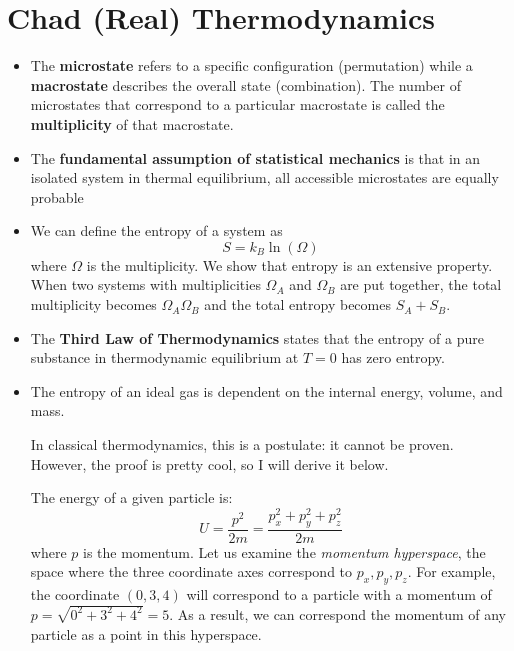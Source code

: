\section{Chad (Real) Thermodynamics}
\begin{itemize}
    \item The \textbf{microstate} refers to a specific configuration (permutation) while a \textbf{macrostate} describes the overall state (combination). The number of microstates that correspond to a particular macrostate is called the \textbf{multiplicity} of that
    macrostate.
    \item The \textbf{fundamental assumption of statistical mechanics} is that in an isolated system in thermal equilibrium, all accessible
    microstates are equally probable
    \item We can define the entropy of a system as
    \begin{equation}
        S = k_B \ln (\Omega)
    \end{equation}
    where $\Omega$ is the multiplicity. We show that entropy is an extensive property. When two systems with multiplicities $\Omega_A$ and $\Omega_B$ are put together, the
    total multiplicity becomes $\Omega_A\Omega_B$ and the total entropy becomes $S_A+S_B.$
    \item The \textbf{Third Law of Thermodynamics} states that the entropy of a pure substance in thermodynamic equilibrium at $T=0$ has zero entropy.
    \item The entropy of an ideal gas is dependent on the internal energy, volume, and mass.
    \begin{idea}
        In classical thermodynamics, this is a postulate: it cannot be proven. However, the proof is pretty cool, so I will derive it below.
        \vspace{2mm}

        The energy of a given particle is: 
        \begin{equation}
            U = \frac{p^2}{2m} = \frac{p_x^2 + p_y^2 + p_z^2}{2m}
        \end{equation}
        where $p$ is the momentum. Let us examine the \textit{momentum hyperspace}, the space where the three coordinate axes correspond to $p_x,p_y,p_z.$ For example, the coordinate $(0,3,4)$ will correspond to a particle with a momentum of $p=\sqrt{0^2+3^2+4^2}=5.$ As a result, we can correspond the momentum of any particle as a point in this hyperspace.
        \vspace{2mm}
        

\end{idea}
\end{itemize}
